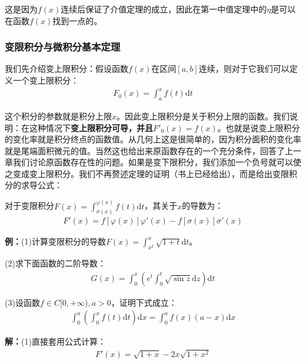 \documentclass{ctexart}
\let\oldtextbf\textbf %
\renewcommand{\textbf}[1]{\textcolor{btex}{\oldtextbf{#1}}} %
\begin{document}
这是因为$f(x)$连续后保证了介值定理的成立，因此在第一中值定理中的$\eta$是可以在函数$f(x)$找到一点的。

\subsubsection{变限积分与微积分基本定理}
我们先介绍变上限积分：假设函数$f(x)$在区间$[a,b]$连续，则对于它我们可以定义一个变上限积分：
\begin{align*}
    F_0(x)=\int_a^x f(t)\mathrm{d}t
\end{align*}

这个积分的参数就是积分上限$x$。因此变上限积分是关于积分上限的函数。我们说明：在这种情况下\textbf{变上限积分可导，并且$F'_0(x)=f(x)$}。也就是说变上限积分的变化率就是积分终点的函数值。从几何上这是很简单的，因为积分面积的变化率就是尾端面积微元的值。当然这也给出来原函数存在的一个充分条件，回答了上一章我们讨论原函数存在性的问题。如果是变下限积分，我们添加一个负号就可以使之变成变上限积分。我们不再赘述定理的证明（书上已经给出），而是给出变限积分的求导公式：
\begin{tcolorbox}[
    colback=bac1,     %
    colframe=fra1,   %
    coltitle=white,             %
    coltext=tex1,
    title=变限积分的求导公式,
    fonttitle=\bfseries,        %
arc=3mm,                     %
breakable
]
对于变限积分$F(x)=\int_{\sigma(x)}^{\varphi(x)}f(t)\mathrm{d}t$，其关于$x$的导数为：
\begin{align*}
    F'(x)=f[\varphi(x)]\varphi'(x)-f[\sigma(x)]\sigma'(x)\tag{5-8}
\end{align*}
\end{tcolorbox}

\textbf{例：}(1)计算变限积分的导数$F(x)=\int_{x^2}^x\sqrt{1+t}\mathrm{d}t$。

(2)求下面函数的二阶导数：
\begin{align*}
    G(x)=\int_0^x\left(e^t\int_0^t \sqrt{\sin z}\mathrm{d}z\right)\mathrm{d}t
\end{align*}

(3)设函数$f\in C[0,+\infty),a>0$，证明下式成立：
\begin{align*}
    \int_0^a\left(\int_0^x f(t)\mathrm{d}t\right)\mathrm{d}x=\int_0^a f(x)(a-x)\mathrm{d}x
\end{align*}

\textbf{解：}(1)直接套用公式计算：
\begin{align*}
    F'(x)=\sqrt{1+x}-2x\sqrt{1+x^2}
\end{align*}
\end{document}

